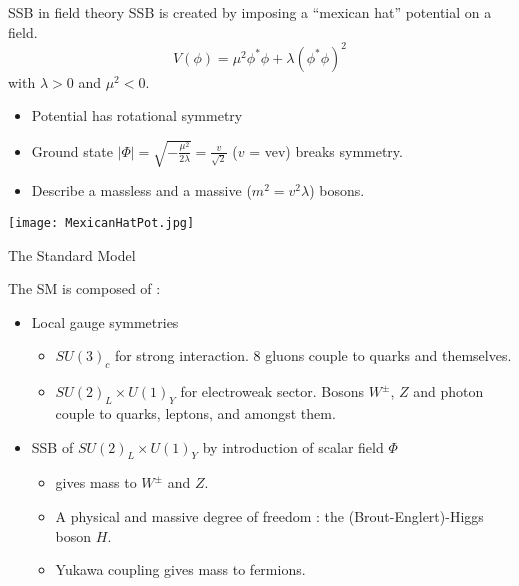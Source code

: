 \begin{frame}{SSB in field theory}
  SSB is created by imposing a ``mexican hat'' potential on a field.
  \begin{equation}
    \label{eq:orgdea495d}
    V(\phi) = \mu^2\phi^*\phi+\lambda(\phi^*\phi)^2
  \end{equation}
  with  $\lambda>0$ and $\mu^2 <0$.
  
  \begin{minipage}{0.49\linewidth}
  \begin{itemize}
  \item Potential has rotational symmetry
  \item Ground state $|\Phi|=\sqrt{-\frac{\mu^2}{2\lambda}}= \frac{v}{\sqrt{2}}$ ($v$ = vev) breaks symmetry.
  \item Describe a massless and a massive ($m^2=v^2\lambda$) bosons.
  \end{itemize}
  \end{minipage}
  \hfill
  \begin{minipage}{0.49\linewidth}
    \texttt{[image: MexicanHatPot.jpg]}
  \end{minipage}
\end{frame}
\begin{frame}{The Standard Model}
  
  The SM is composed of :
  
  \begin{itemize}
  \item Local gauge symmetries
    \begin{itemize}
    \item $SU(3)_c$ for strong interaction. 8 gluons couple to quarks and themselves.
    \item $SU(2)_L\times U(1)_Y$ for electroweak sector. Bosons $W^\pm$, $Z$ and photon couple to quarks, leptons, and amongst them.
    \end{itemize}
    \vfill
  \item SSB of $SU(2)_L\times U(1)_Y$ by introduction of scalar field $\Phi$
    \begin{itemize}
    \item gives mass to $W^\pm$ and $Z$.
    \item A physical and massive degree of freedom : the (Brout-Englert)-Higgs boson $H$.
    \item Yukawa coupling gives mass to fermions.
    \end{itemize}
  \end{itemize}
\end{frame}
